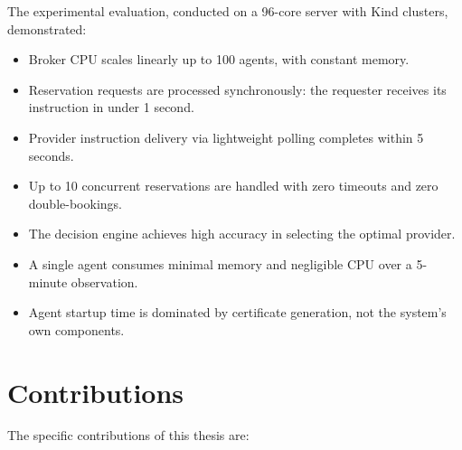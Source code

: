 The experimental evaluation, conducted on a 96-core server with Kind clusters, demonstrated:

\begin{itemize}
    \item Broker CPU scales linearly up to 100 agents, with constant memory.
    \item Reservation requests are processed synchronously: the requester receives its instruction in under 1 second.
    \item Provider instruction delivery via lightweight polling completes within 5 seconds.
    \item Up to 10 concurrent reservations are handled with zero timeouts and zero double-bookings.
    \item The decision engine achieves high accuracy in selecting the optimal provider.
    \item A single agent consumes minimal memory and negligible CPU over a 5-minute observation.
    \item Agent startup time is dominated by certificate generation, not the system's own components.
\end{itemize}


\section{Contributions}
\label{sec:final-contributions}

The specific contributions of this thesis are:

